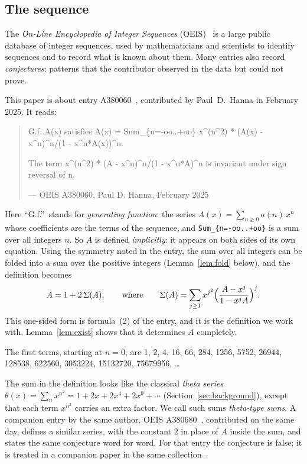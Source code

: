 \documentclass[11pt,a4paper]{article}
\theoremstyle{definition}
\theoremstyle{remark}
\begin{document}
\subsection{The sequence}\label{sec:sequence}
The \emph{On-Line Encyclopedia of Integer Sequences} (OEIS)~\cite{oeisdb} is a large public database of integer
sequences, used by mathematicians and scientists to identify sequences and to record what is known about them. Many
entries also record \emph{conjectures}: patterns that the contributor observed in the data but could not prove.

This paper is about entry A380060~\cite{oeis}, contributed by Paul~D.~Hanna in February 2025. It reads:
\begin{quote}\small\ttfamily\raggedright G.f. A(x) satisfies A(x) = Sum\_\{n=-oo..+oo\} x\^{}(n\^{}2) * (A(x) - x\^{}n)\^{}n/(1 - x\^{}n*A(x))\^{}n.\par\smallskip The term x\^{}(n\^{}2) * (A - x\^{}n)\^{}n/(1 - x\^{}n*A)\^{}n is invariant under sign reversal of n.\par\smallskip\hfill\textrm{--- OEIS A380060, Paul D. Hanna, February 2025}\end{quote}

Here ``G.f.''\ stands for \emph{generating function}: the series $A(x)=\sum_{n\ge0}a(n)\,x^n$ whose coefficients are
the terms of the sequence, and \texttt{Sum\_\{n=-oo..+oo\}} is a sum over all integers $n$. So $A$ is defined \emph{implicitly}: it appears on both sides of its own equation.
Using the symmetry noted in the entry, the sum over all integers can be folded into a sum over the positive integers
(Lemma~\ref{lem:fold} below), and the definition becomes
\begin{equation}\label{eq:def}
A=1+2\,\Sigma(A),\qquad\text{where}\qquad
\Sigma(A)=\sum_{j\ge1}x^{j^2}\Bigl(\frac{A-x^j}{1-x^jA}\Bigr)^{j}.
\end{equation}
This one-sided form is formula~(2) of the entry, and it is the definition we work with. Lemma~\ref{lem:exist} shows
that it determines $A$ completely.

The first terms, starting at $n=0$, are 1, 2, 4, 16, 66, 284, 1256, 5752, 26944, 128538, 622560, 3053224, 15132720, 75679956, \dots{}

The sum in the definition looks like the classical \emph{theta series} $\theta(x)=\sum_nx^{n^2}=1+2x+2x^4+2x^9+\cdots$
(Section~\ref{sec:background}), except that each term $x^{n^2}$ carries an extra factor. We call such sums
\emph{theta-type sums}. A companion entry by the same author, OEIS A380680~\cite{oeisother}, contributed on
the same day, defines a similar series, with the constant $2$ in place of $A$ inside the sum, and states the same
conjecture word for word. For that entry the conjecture is false; it is treated in a companion paper in the same
collection~\cite{repo}.
\end{document}
